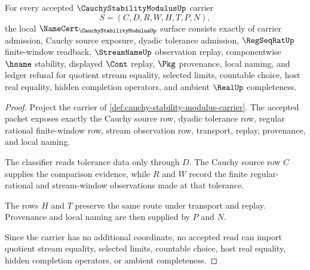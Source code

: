 \begin{theorem}
\label{thm:cauchy-stability-modulus-namecert-obligations}
For every accepted $\CauchyStabilityModulusUp$ carrier
$$
S=(C,D,R,W,H,T,P,N),
$$
the local $\NameCert_{\CauchyStabilityModulusUp}$ surface consists exactly of carrier admission, Cauchy source exposure, dyadic tolerance admission, $\RegSeqRatUp$ finite-window readback, $\StreamNameUp$ observation replay, componentwise $\hsame$ stability, displayed $\Cont$ replay, $\Pkg$ provenance, local naming, and ledger refusal for quotient stream equality, selected limits, countable choice, host real equality, hidden completion operators, and ambient $\RealUp$ completeness.
\end{theorem}
\begin{proof}
Project the carrier of \autoref{def:cauchy-stability-modulus-carrier}. The accepted packet exposes exactly the Cauchy source row, dyadic tolerance row, regular rational finite-window row, stream observation row, transport, replay, provenance, and local naming.

The classifier reads tolerance data only through $D$. The Cauchy source row $C$ supplies the comparison evidence, while $R$ and $W$ record the finite regular-rational and stream-window observations made at that tolerance.

The rows $H$ and $T$ preserve the same route under transport and replay. Provenance and local naming are then supplied by $P$ and $N$.

Since the carrier has no additional coordinate, no accepted read can import quotient stream equality, selected limits, countable choice, host real equality, hidden completion operators, or ambient completeness.
\end{proof}

